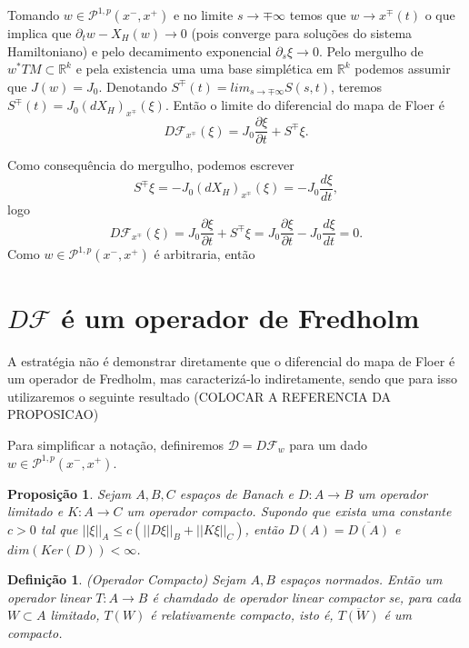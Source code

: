 \documentclass[12pt]{book}
\newtheorem{definicao}[teorema]{Definição}
\newtheorem{proposicao}[teorema]{Proposição}
\newcommand{\caminhosexponenciaisconectantes}[2]{\mathcal{P}^{1,p}(#1, #2)}
\newcommand{\caminhosexponenciaisconectantespadrao}{\caminhosexponenciaisconectantes{x^{-}}{x^{+}}}
\newcommand{\campohamiltoniano}[1]{X_{H}(#1)}
\newcommand{\diferebcialmapafloerabrev}{\mathcal{D}}
\newcommand{\derivada}[2]{\frac{d #1}{d #2}}
\newcommand{\derivadaparcial}[2]{\frac{\partial #1}{\partial #2}}
\newcommand{\derivadaparcialabrev}[1]{\partial_{#1}}
\newcommand{\diferencialhamiltoniano}[1]{(dX_{H})_{#1}}
\newcommand{\estruturacomplexa}{J_{0}}
\newcommand{\mapafloer}{\mathcal{F}}
\newcommand{\norma}[1]{||#1||}
\newcommand{\normasubscrito}[2]{\norma{#1}_{#2}}
\newcommand{\pullbackfibradotangente}[2]{#1^{*}T#2}
\newcommand{\pullbackfibradotangenteM}[1]{\pullbackfibradotangente{#1}{M}}
\newcommand{\real}[1]{\mathbb{R}^{#1}}
\newcommand{\vermelho}[1]{{\color{red}#1}}
\begin{document}
	Tomando $w\in \caminhosexponenciaisconectantespadrao$ e no limite $s\to \mp\infty$ temos que $w \to x^{\mp}(t)$ o que implica que $\derivadaparcialabrev{t}w - \campohamiltoniano{w}\to 0$ (pois converge para soluções do sistema Hamiltoniano) e pelo decamimento exponencial $\derivadaparcialabrev{s}\xi \to 0$. Pelo mergulho de $\pullbackfibradotangenteM{w} \subset \real{k}$ e pela existencia uma uma base simplética em $\real{k}$ podemos assumir que $J(w) = \estruturacomplexa$. Denotando $S^{\mp}(t) = lim_{s\to \mp \infty}S(s,t)$, teremos $S^{\mp}(t) = \estruturacomplexa\diferencialhamiltoniano{x^{\mp}}(\xi)$. Então o limite do diferencial do mapa de Floer é
	$$
	D\mapafloer_{x^{\mp}}(\xi) =  \estruturacomplexa\derivadaparcial{\xi}{t}+ S^{\mp}\xi.
	$$
	
	Como consequência do mergulho, podemos escrever
	$$
	S^{\mp}\xi = -\estruturacomplexa\diferencialhamiltoniano{x^{\mp}}(\xi) = -\estruturacomplexa\derivada{\xi}{t},
	$$
	logo
	$$
		D\mapafloer_{x^{\mp}}(\xi) =  \estruturacomplexa\derivadaparcial{\xi}{t}+ S^{\mp}\xi =
		 \estruturacomplexa\derivadaparcial{\xi}{t} -\estruturacomplexa\derivada{\xi}{t}
		=0.
	$$
	Como $w \in \caminhosexponenciaisconectantespadrao$ é arbitraria, então 
	 
	\section{$D\mapafloer$ é um operador de Fredholm}
	A estratégia não é demonstrar diretamente que o diferencial do mapa de Floer é um operador de Fredholm, mas caracterizá-lo indiretamente, sendo que para isso utilizaremos o seguinte resultado  \vermelho{(COLOCAR A REFERENCIA DA PROPOSICAO)}

	Para simplificar a notação, definiremos $\diferebcialmapafloerabrev = D\mapafloer_{w}$ para um dado $w\in \caminhosexponenciaisconectantespadrao$.
	
	\begin{proposicao}
		Sejam $A,B,C$ espaços de Banach e $D:A\to B$ um operador limitado e $K:A \to C$ um operador compacto. Supondo que exista uma constante $c>0$ tal que $\normasubscrito{\xi}{A} \leq c(\normasubscrito{D\xi}{B} + \normasubscrito{K\xi}{C})$, então $D(A) = \overline{D(A)}$ e $dim(Ker(D)) <\infty$.
	\end{proposicao}
	
	\begin{definicao}\label{definicao_operador_compacto}
		(Operador Compacto) Sejam $A, B$ espaços normados. Então um operador linear $T:A\to B$ é chamdado de operador linear compactor se, para cada $W \subset A$ limitado, $T(W)$ é relativamente compacto, isto é, $\overline{T(W)} $ é um compacto.
	\end{definicao}
	
\end{document}
